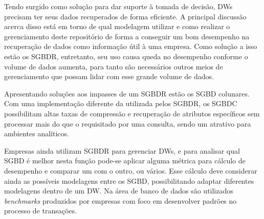 
Tendo surgido como solução para dar suporte à tomada de decisão, DWs precisam ter seus dados recuperados de forma eficiente. A principal discussão acerca disso está em torno de qual modelagem utilizar e como realizar o gerenciamento deste repositório de forma a conseguir um bom desempenho na recuperação de dados como informação útil à uma empresa. Como solução a isso estão os SGBDR, entretanto, seu uso causa queda no desempenho conforme o volume de dados aumenta, para tanto são necessários outros meios de gerenciamento que possam lidar com esse grande volume de dados.

Apresentando soluções aos impasses de um SGBDR estão os SGBD colunares. Com uma implementação diferente da utilizada pelos SGBDR, os SGBDC possibilitam altas taxas de compressão e recuperação de atributos específicos sem processar mais do que o requisitado por uma consulta, sendo um atrativo para ambientes analíticos. 

Empresas ainda utilizam SGBDR para gerenciar DWs, e para analisar qual SGBD é melhor nesta função pode-se aplicar alguma métrica para cálculo de desempenho e comparar um com o outro, ou vários. Esse cálculo deve considerar ainda as possíveis modelagens entre os SGBD, possibilitando adaptar diferentes modelagens dentro de um DW. Na área de banco de dados são utilizados \textit{benchmarks} produzidos por empresas com foco em desenvolver padrões no processo de transações.